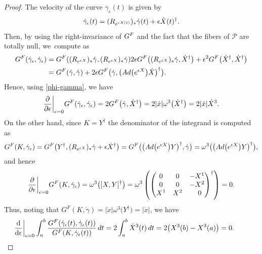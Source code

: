 \documentclass[10pt,a4paper]{amsart}
\begin{document}
\begin{proof}
The velocity of the curve $\gamma_\epsilon(t)$ is given by
\[
\dot\gamma_\epsilon(t)=(R_{{\rm e}^{\epsilon X(t)}})_* \dot\gamma(t)+\epsilon\dot X(t)^{\dagger}.
\]
Then, by using the right-invariance of $G^{\rm F}$ and the fact that the fibers of $\mathcal{P}$ are totally null, we~compute as
\begin{align*}
G^{\rm F}(\dot\gamma_\epsilon, \dot\gamma_\epsilon)
={}&G^{\rm F} ((R_{{\rm e}^{\epsilon X}})_* \dot\gamma, (R_{{\rm e}^{\epsilon X}})_* \dot\gamma )
 2\epsilon G^{\rm F}\bigl((R_{{\rm e}^{\epsilon X}})_* \dot\gamma,
\dot X^{\dagger}\bigr)+\epsilon^2G^{\rm F}\bigl(\dot X^\dagger, \dot X^\dagger\bigr) \\
={}&G^{\rm F}(\dot\gamma, \dot\gamma)
+2\epsilon G^{\rm F}\bigl(\dot\gamma, \bigl({\rm Ad}\bigl({\rm e}^{\epsilon X}\bigr)\dot X\bigr)^\dagger\bigr).
\end{align*}
Hence, using \eqref{phi-gamma}, we have
\begin{equation*}%
\frac{\partial}{\partial \epsilon}\bigg|_{\epsilon=0}G^{\rm F}(\dot\gamma_\epsilon, \dot\gamma_\epsilon)
=2G^{\rm F}\bigl(\dot\gamma, \dot X^\dagger\bigr)
=2|\dot x|\omega^3\bigl(\dot X^\dagger\bigr)=2|\dot x|\dot X^3.
\end{equation*}
On the other hand, since $K=Y^\dagger$ the denominator of the integrand is computed as
\begin{align*}
G^{\rm F}(K, \dot\gamma_\epsilon)
=G^{\rm F}\bigl(Y^\dagger, (R_{{\rm e}^{\epsilon X}})_* \dot\gamma+\epsilon\dot X^{\dagger}\bigr)
=G^{\rm F}\bigl(\bigl({\rm Ad}\bigl({\rm e}^{\epsilon X}\bigr) Y\bigr)^\dagger, \dot\gamma\bigr)
=\omega^3\bigl(\bigl({\rm Ad}\bigl({\rm e}^{\epsilon X}\bigr) Y\bigr)^\dagger\bigr),
\end{align*}
and hence
\[
\frac{\partial}{\partial \epsilon}\bigg|_{\epsilon=0}G^{\rm F}(K, \dot\gamma_\epsilon)
=\omega^3\bigl([X, Y]^\dagger\bigr) =\omega^3\left(\begin{pmatrix}
0 & 0 & -X^1 \\
0 & 0 & -X^2 \\
X^1 & X^2 & \hphantom{-}0
\end{pmatrix}^{\dagger}\right)=0.
\]
Thus, noting that $G^{F}(K, \dot\gamma)=|\dot x|\omega^3\bigl(Y^\dagger\bigr)=|\dot x|$, we have
\[
\frac{\mathrm{d}}{\mathrm{d} \epsilon}\bigg|_{\epsilon=0}
\int _a^b \frac{G^{\rm F}(\dot \gamma_\epsilon(t), \dot \gamma_\epsilon(t))}{G^{\rm F}(K, \dot \gamma_\epsilon(t))}\,{\rm d}t=
2\int_a^b \dot X^3(t) \, {\rm d}t=2\bigl(X^3(b)-X^3(a)\bigr)=0.
\tag*{\qed}
\]
\renewcommand{\qed}{}
\end{proof}
\end{document}
